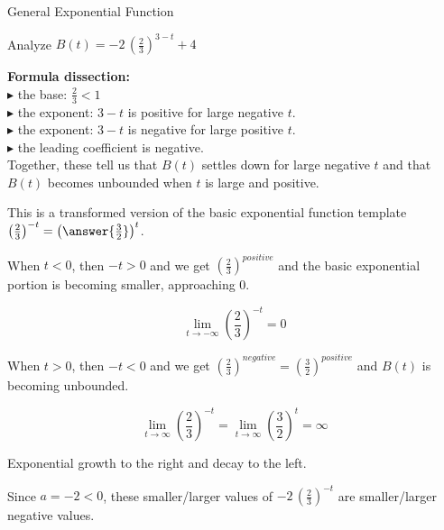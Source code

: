 \documentclass{ximera}
\begin{document}
\begin{example}  General Exponential Function



Analyze   $B(t) = -2 \, \left( \frac{2}{3} \right)^{3-t} + 4$ \\


\begin{explanation}


\textbf{\textcolor{purple!85!blue}{Formula dissection:}}  \\


$\blacktriangleright$  the base: $\frac{2}{3} < 1$\\
$\blacktriangleright$  the exponent: $3-t$ is positive for large negative $t$. \\
$\blacktriangleright$  the exponent: $3-t$ is negative for large positive $t$. \\
$\blacktriangleright$  the leading coefficient is negative. \\


Together, these tell us that $B(t)$ settles down for large negative $t$ and that $B(t)$ becomes unbounded when $t$ is large and positive.



This is a transformed version of the basic exponential function template $\left( \frac{2}{3} \right)^{-t} = \left( \answer{\frac{3}{2}} \right)^t$.  



When $t < 0$, then $-t > 0$ and we get  $\left( \frac{2}{3} \right)^{positive}$ and the basic exponential portion is becoming smaller, approaching $0$.  





\[ \lim\limits_{t \to -\infty} \left( \frac{2}{3} \right)^{-t}  = 0 \]



When $t > 0$, then $-t < 0$ and we get  $\left( \frac{2}{3} \right)^{negative} = \left( \frac{3}{2} \right)^{positive}$ and $B(t)$ is becoming unbounded.  



\[ \lim\limits_{t \to \infty} \left( \frac{2}{3} \right)^{-t}  = \lim\limits_{t \to \infty} \left( \frac{3}{2} \right)^t  = \infty \]




Exponential growth to the right and decay to the left.






Since $a = -2 < 0$, these smaller/larger values of $-2 \, \left( \frac{2}{3} \right)^{-t}$ are smaller/larger negative values.




\end{explanation}
\end{example}
\end{document}
